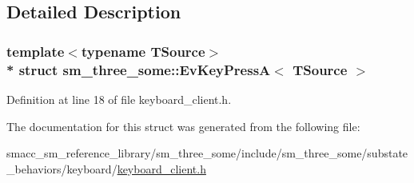 \subsection{Detailed Description}
\subsubsection*{template$<$typename T\+Source$>$\\*
struct sm\+\_\+three\+\_\+some\+::\+Ev\+Key\+Press\+A$<$ T\+Source $>$}



Definition at line 18 of file keyboard\+\_\+client.\+h.



The documentation for this struct was generated from the following file\+:\begin{DoxyCompactItemize}
\item 
smacc\+\_\+sm\+\_\+reference\+\_\+library/sm\+\_\+three\+\_\+some/include/sm\+\_\+three\+\_\+some/substate\+\_\+behaviors/keyboard/\hyperlink{keyboard__client_8h}{keyboard\+\_\+client.\+h}\end{DoxyCompactItemize}
